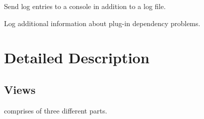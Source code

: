 \documentclass[english]{article}
\begin{document}
\begin{Description}

\item[\Opt{-consolelog}]
Send log entries to a console in addition to a log file.

\item[\Opt{-debug}]
Log additional information about plug-in dependency problems.

\end{Description}


\section{Detailed Description}

\subsection{Views}

 comprises of three different parts. 
\end{document}
